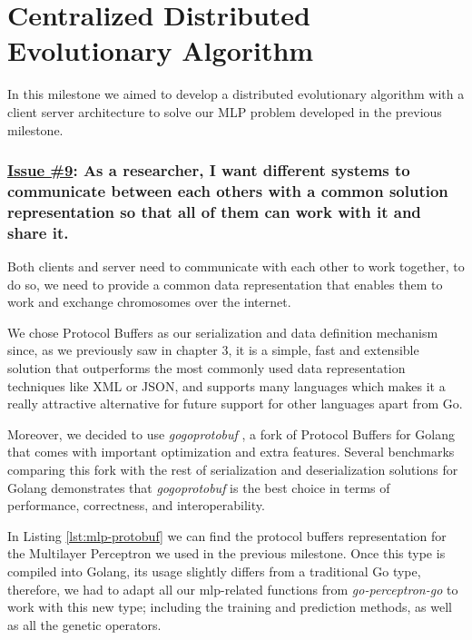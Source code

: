 \section{Centralized Distributed Evolutionary Algorithm}

In this milestone we aimed to develop a distributed evolutionary algorithm with a client server architecture to solve our MLP problem developed in the previous milestone.

\subsubsection*{\href{https://github.com/salvacorts/TFG-Parasitic-Metaheuristics/issues/9}{Issue \#9}: As a researcher, I want different systems to communicate between each others with a common solution representation so that all of them can work with it and share it.}

Both clients and server need to communicate with each other to work together, to do so, we need to provide a common data representation that enables them to work and exchange chromosomes over the internet. 

We chose Protocol Buffers as our serialization and data definition mechanism since, as we previously saw in chapter 3, it is a simple, fast and extensible solution that outperforms the most commonly used data representation techniques like XML or JSON, and supports many languages which makes it a really attractive alternative for future support for other languages apart from Go.

Moreover, we decided to use \textit{gogoprotobuf} \cite{gogo}, a fork of Protocol Buffers for Golang that comes with important optimization and extra features. Several benchmarks \cite{gogo-bench} comparing this fork with the rest of serialization and deserialization solutions for Golang demonstrates that \textit{gogoprotobuf} is the best choice in terms of performance, correctness, and interoperability.

In Listing \ref{lst:mlp-protobuf} we can find the protocol buffers representation for the Multilayer Perceptron we used in the previous milestone. Once this type is compiled into Golang, its usage slightly differs from a traditional Go type, therefore, we had to adapt all our mlp-related functions from \textit{go-perceptron-go} to work with this new type; including the training and prediction methods, as well as all the genetic operators.


